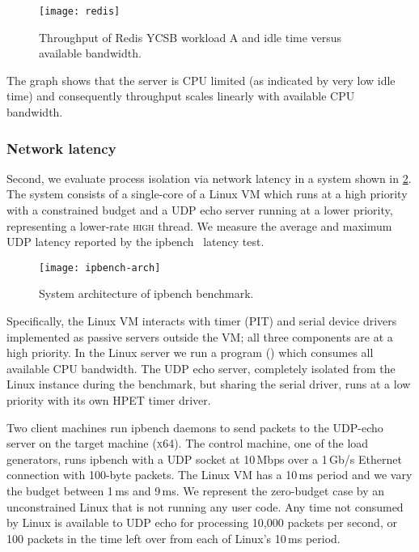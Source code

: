 \begin{figure}[h]
  \centering
  \texttt{[image: redis]}
  \caption[Results of Redis isolation benchmark.]{Throughput of Redis YCSB workload A and idle time versus available bandwidth.}
  \label{f:redis}
\end{figure}

The graph shows that the server is CPU limited (as indicated by very low idle time)
and consequently throughput scales linearly with available CPU
bandwidth.

\subsubsection{Network latency}

Second, we evaluate process isolation via network latency in a system shown in \cref{f:ipbench-arch}. 
The system consists of a single-core of a Linux \gls{VM} which runs at a high priority with a
constrained budget and a \gls{UDP} echo server running at a lower priority,
representing a lower-rate \textsc{high} thread. We
measure the average  and maximum UDP latency reported by the
ipbench~\citep{Wienand_Macpherson_04} latency test.

\begin{figure}[h]
    \centering
    \texttt{[image: ipbench-arch]}
    \caption{System architecture of ipbench benchmark.}
    \label{f:ipbench-arch}
\end{figure}


Specifically, the Linux VM interacts with timer (PIT) and serial device drivers implemented as
passive servers outside the \gls{VM}; all three components are at a high priority. In the Linux server we
run a program () which consumes all available
CPU bandwidth.  The UDP echo server, completely isolated from the Linux instance during the
benchmark, but sharing the
serial driver, runs at a low priority with its own HPET timer
driver.

Two client machines run ipbench daemons to send packets to the UDP-echo server on the target machine
(\textsc{x64}). The control machine, one of the load generators, runs ipbench with a \gls{UDP} socket at 10\,Mbps over a 1\,Gb/s Ethernet connection with 100-byte packets. The Linux VM has a 10\,ms period and we vary the
budget between 1\,ms and 9\,ms.
We represent the zero-budget case by an unconstrained Linux that is not running any user code.
Any time not consumed by Linux is available to UDP echo for processing
10,000 packets per second, or 100 packets in the time left over from
each of Linux's 10\,ms period.

